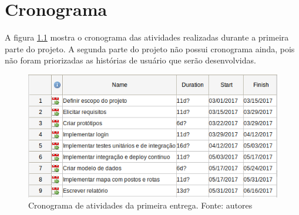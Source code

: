 \chapter[Cronograma]{Cronograma}
\label{chap:crono}

A figura \ref{img:cronograma} mostra o cronograma das atividades realizadas durante a primeira parte do projeto. A segunda parte do projeto não possui cronograma ainda, pois não foram priorizadas as histórias de usuário que serão desenvolvidas.

\begin{figure}[H]
    \centering
    \includegraphics[scale=0.5]{figuras/cronograma_r1.png}
    \caption[Cronograma de atividades da primeira entrega.]{Cronograma de atividades da primeira entrega. Fonte: autores}
    \label{img:cronograma}
\end{figure}
